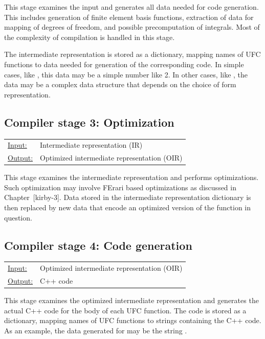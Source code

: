 This stage examines the input and generates all data needed for code
generation. This includes generation of finite element basis
functions, extraction of data for mapping of degrees of freedom, and
possible precomputation of integrals. Most of the complexity of
compilation is handled in this stage.

The intermediate representation is stored as a dictionary, mapping
names of UFC functions to data needed for generation of the
corresponding code. In simple cases, like , this
data may be a simple number like 2. In other cases, like
, the data may be a complex
data structure that depends on the choice of form representation.

\subsection{Compiler stage 3: Optimization}

\begin{tabular}{ll}
  \underline{Input:}  & Intermediate representation (IR) \\
  \underline{Output:} & Optimized intermediate representation (OIR) \\
\end{tabular}
\vspace{0.5cm}

This stage examines the intermediate representation and performs
optimizations. Such optimization may involve FErari based
optimizations as discussed in Chapter~[kirby-3]. Data stored in the
intermediate representation dictionary is then replaced by new data
that encode an optimized version of the function in question.

\subsection{Compiler stage 4: Code generation}

\begin{tabular}{ll}
  \underline{Input:}  & Optimized intermediate representation (OIR) \\
  \underline{Output:} & C++ code
\end{tabular}
\vspace{0.5cm}

This stage examines the optimized intermediate representation and
generates the actual C++ code for the body of each UFC function. The
code is stored as a dictionary, mapping names of UFC functions to
strings containing the C++ code. As an example, the data generated for
 may be the string .

